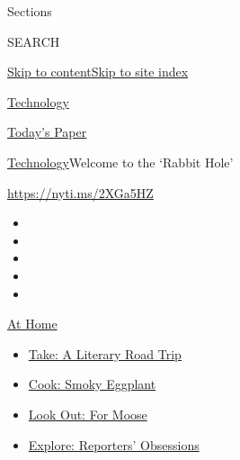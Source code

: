 Sections

SEARCH

\protect\hyperlink{site-content}{Skip to
content}\protect\hyperlink{site-index}{Skip to site index}

\href{https://www.nytimes3xbfgragh.onion/section/technology}{Technology}

\href{https://myaccount.nytimes3xbfgragh.onion/auth/login?response_type=cookie\&client_id=vi}{}

\href{https://www.nytimes3xbfgragh.onion/section/todayspaper}{Today's
Paper}

\href{/section/technology}{Technology}\textbar{}Welcome to the `Rabbit
Hole'

\href{https://nyti.ms/2XGa5HZ}{https://nyti.ms/2XGa5HZ}

\begin{itemize}
\item
\item
\item
\item
\item
\end{itemize}

\href{https://www.nytimes3xbfgragh.onion/spotlight/at-home?action=click\&pgtype=Article\&state=default\&region=TOP_BANNER\&context=at_home_menu}{At
Home}

\begin{itemize}
\tightlist
\item
  \href{https://www.nytimes3xbfgragh.onion/2020/07/28/books/time-for-a-literary-road-trip.html?action=click\&pgtype=Article\&state=default\&region=TOP_BANNER\&context=at_home_menu}{Take:
  A Literary Road Trip}
\item
  \href{https://www.nytimes3xbfgragh.onion/2020/07/29/magazine/bored-with-your-home-cooking-some-smoky-eggplant-will-fix-that.html?action=click\&pgtype=Article\&state=default\&region=TOP_BANNER\&context=at_home_menu}{Cook:
  Smoky Eggplant}
\item
  \href{https://www.nytimes3xbfgragh.onion/2020/07/27/travel/moose-michigan-isle-royale.html?action=click\&pgtype=Article\&state=default\&region=TOP_BANNER\&context=at_home_menu}{Look
  Out: For Moose}
\item
  \href{https://www.nytimes3xbfgragh.onion/interactive/2020/at-home/even-more-reporters-editors-diaries-lists-recommendations.html?action=click\&pgtype=Article\&state=default\&region=TOP_BANNER\&context=at_home_menu}{Explore:
  Reporters' Obsessions}
\end{itemize}


